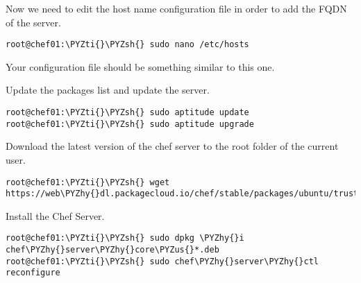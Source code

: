 Now we need to edit the host name configuration file in order to add the FQDN of the server.
\begin{codelisting}
\label{code:}
\codecaption{}
\begin{Verbatim}[fontsize=\relsize{-2.5},fontseries=b,commandchars=\\\{\}]
root@chef01:\PYZti{}\PYZsh{} sudo nano /etc/hosts
\end{Verbatim}
\end{codelisting}

Your configuration file should be something similar to this one.


Update the packages list and update the server.

\begin{codelisting}
\label{code:}
\codecaption{}
\begin{Verbatim}[fontsize=\relsize{-2.5},fontseries=b,commandchars=\\\{\}]
root@chef01:\PYZti{}\PYZsh{} sudo aptitude update
root@chef01:\PYZti{}\PYZsh{} sudo aptitude upgrade
\end{Verbatim}
\end{codelisting}

Download the latest version of the chef server to the root folder of the current user.

\begin{codelisting}
\label{code:}
\codecaption{}
\begin{Verbatim}[fontsize=\relsize{-2.5},fontseries=b,commandchars=\\\{\}]
root@chef01:\PYZti{}\PYZsh{} wget https://web\PYZhy{}dl.packagecloud.io/chef/stable/packages/ubuntu/trusty/chef\PYZhy{}server\PYZhy{}core\PYZus{}12.2.0\PYZhy{}1\PYZus{}amd64.deb
\end{Verbatim}
\end{codelisting}

Install the Chef Server.

\begin{codelisting}
\label{code:}
\codecaption{}
\begin{Verbatim}[fontsize=\relsize{-2.5},fontseries=b,commandchars=\\\{\}]
root@chef01:\PYZti{}\PYZsh{} sudo dpkg \PYZhy{}i chef\PYZhy{}server\PYZhy{}core\PYZus{}*.deb
root@chef01:\PYZti{}\PYZsh{} sudo chef\PYZhy{}server\PYZhy{}ctl reconfigure
\end{Verbatim}
\end{codelisting}

